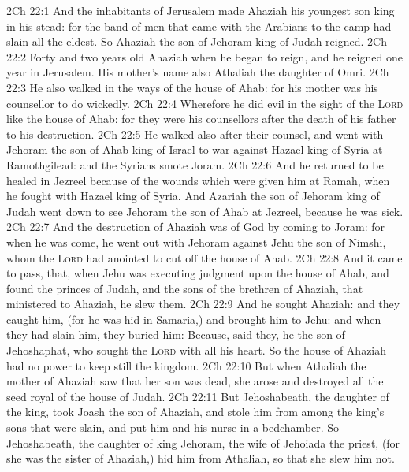 \vs 2Ch 22:1 And the inhabitants of Jerusalem made Ahaziah his youngest son king in his stead: for the band of men that came with the Arabians to the camp had slain all the eldest. So Ahaziah the son of Jehoram king of Judah reigned.
\vs 2Ch 22:2 Forty and two years old  Ahaziah when he began to reign, and he reigned one year in Jerusalem. His mother's name also  Athaliah the daughter of Omri.
\vs 2Ch 22:3 He also walked in the ways of the house of Ahab: for his mother was his counsellor to do wickedly.
\vs 2Ch 22:4 Wherefore he did evil in the sight of the \textsc{Lord} like the house of Ahab: for they were his counsellors after the death of his father to his destruction.
\vs 2Ch 22:5 He walked also after their counsel, and went with Jehoram the son of Ahab king of Israel to war against Hazael king of Syria at Ramothgilead: and the Syrians smote Joram.
\vs 2Ch 22:6 And he returned to be healed in Jezreel because of the wounds which were given him at Ramah, when he fought with Hazael king of Syria. And Azariah the son of Jehoram king of Judah went down to see Jehoram the son of Ahab at Jezreel, because he was sick.
\vs 2Ch 22:7 And the destruction of Ahaziah was of God by coming to Joram: for when he was come, he went out with Jehoram against Jehu the son of Nimshi, whom the \textsc{Lord} had anointed to cut off the house of Ahab.
\vs 2Ch 22:8 And it came to pass, that, when Jehu was executing judgment upon the house of Ahab, and found the princes of Judah, and the sons of the brethren of Ahaziah, that ministered to Ahaziah, he slew them.
\vs 2Ch 22:9 And he sought Ahaziah: and they caught him, (for he was hid in Samaria,) and brought him to Jehu: and when they had slain him, they buried him: Because, said they, he  the son of Jehoshaphat, who sought the \textsc{Lord} with all his heart. So the house of Ahaziah had no power to keep still the kingdom.
\vs 2Ch 22:10 But when Athaliah the mother of Ahaziah saw that her son was dead, she arose and destroyed all the seed royal of the house of Judah.
\vs 2Ch 22:11 But Jehoshabeath, the daughter of the king, took Joash the son of Ahaziah, and stole him from among the king's sons that were slain, and put him and his nurse in a bedchamber. So Jehoshabeath, the daughter of king Jehoram, the wife of Jehoiada the priest, (for she was the sister of Ahaziah,) hid him from Athaliah, so that she slew him not.
